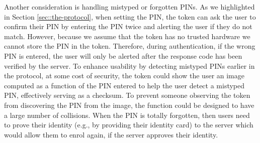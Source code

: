 \documentclass[runningheads]{llncs}
\begin{document}
Another consideration is handling mistyped or forgotten PINs. As we highlighted in Section \ref{sec::the-protocol}, when setting the PIN, the token can ask the user to confirm their PIN by entering the PIN twice and alerting the user if they do not match. However, because we assume that the token has no trusted hardware we cannot store the PIN in the token. Therefore, during authentication, if the wrong PIN is entered, the user will only be alerted after the response code has been verified by the server. To enhance usability by detecting mistyped PINs earlier in the protocol, at some cost of security, the token could show the user an image computed as a function of the PIN entered to help the user detect a mistyped PIN, effectively serving as a checksum. To prevent someone observing the token from discovering the PIN from the image, the function could be designed to have a large number of collisions. When the PIN is totally forgotten, then users need to prove their identity (e.g., by providing their identity card) to the server which would allow them to enrol again, if the server approves their identity. 

%











\appendix
%
%

%

%







%
\end{document}
